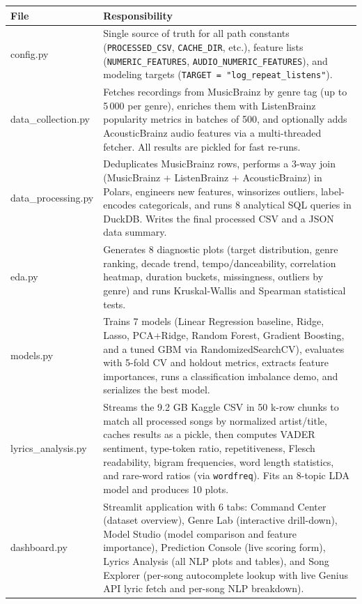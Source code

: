 \documentclass[11pt, letterpaper]{article}
\begin{document}
\begin{longtable}{>{\ttfamily\small}p{4.2cm} p{10.3cm}}
\toprule
\normalfont\textbf{File} & \textbf{Responsibility} \\
\midrule
config.py &
    Single source of truth for all path constants (\texttt{PROCESSED\_CSV},
    \texttt{CACHE\_DIR}, etc.), feature lists (\texttt{NUMERIC\_FEATURES},
    \texttt{AUDIO\_NUMERIC\_FEATURES}), and modeling targets
    (\texttt{TARGET = "log\_repeat\_listens"}). \\[4pt]

data\_collection.py &
    Fetches recordings from MusicBrainz by genre tag (up to 5\,000 per genre),
    enriches them with ListenBrainz popularity metrics in batches of 500, and
    optionally adds AcousticBrainz audio features via a multi-threaded fetcher.
    All results are pickled for fast re-runs. \\[4pt]

data\_processing.py &
    Deduplicates MusicBrainz rows, performs a 3-way join (MusicBrainz +
    ListenBrainz + AcousticBrainz) in Polars, engineers new features, winsorizes
    outliers, label-encodes categoricals, and runs 8 analytical SQL queries
    in DuckDB. Writes the final processed CSV and a JSON data summary. \\[4pt]

eda.py &
    Generates 8 diagnostic plots (target distribution, genre ranking, decade
    trend, tempo/danceability, correlation heatmap, duration buckets,
    missingness, outliers by genre) and runs Kruskal-Wallis and Spearman
    statistical tests. \\[4pt]

models.py &
    Trains 7 models (Linear Regression baseline, Ridge, Lasso, PCA+Ridge,
    Random Forest, Gradient Boosting, and a tuned GBM via RandomizedSearchCV),
    evaluates with 5-fold CV and holdout metrics, extracts feature importances,
    runs a classification imbalance demo, and serializes the best model. \\[4pt]

lyrics\_analysis.py &
    Streams the 9.2 GB Kaggle CSV in 50 k-row chunks to match all processed
    songs by normalized artist/title, caches results as a pickle, then computes
    VADER sentiment, type-token ratio, repetitiveness, Flesch readability,
    bigram frequencies, word length statistics, and rare-word ratios
    (via \texttt{wordfreq}). Fits an 8-topic LDA model and produces 10 plots. \\[4pt]

dashboard.py &
    Streamlit application with 6 tabs: Command Center (dataset overview),
    Genre Lab (interactive drill-down), Model Studio (model comparison and
    feature importance), Prediction Console (live scoring form), Lyrics Analysis
    (all NLP plots and tables), and Song Explorer (per-song autocomplete
    lookup with live Genius API lyric fetch and per-song NLP breakdown). \\

\bottomrule
\end{longtable}
\end{document}
